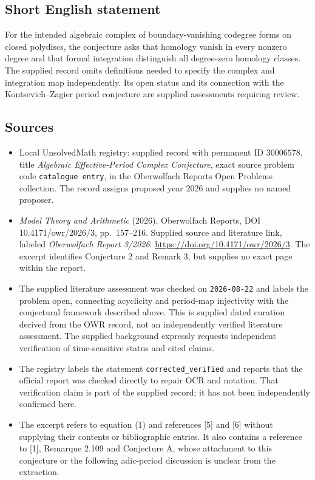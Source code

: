 \documentclass[11pt]{article}
\begin{document}
\subsection{Short English statement}
For the intended algebraic complex of boundary-vanishing codegree forms on closed polydiscs, the conjecture asks that homology vanish in every nonzero degree and that formal integration distinguish all degree-zero homology classes. The supplied record omits definitions needed to specify the complex and integration map independently. Its open status and its connection with the Kontsevich--Zagier period conjecture are supplied assessments requiring review.
\subsection{Sources}
\begin{itemize}
\item Local UnsolvedMath registry: supplied record with permanent ID \(30006578\), title \emph{Algebraic Effective-Period Complex Conjecture}, exact source problem code \texttt{catalogue entry}, in the Oberwolfach Reports Open Problems collection. The record assigns proposed year 2026 and supplies no named proposer.
\item \emph{Model Theory and Arithmetic} (2026), Oberwolfach Reports, DOI 10.4171/owr/2026/3, pp.\ 157--216. Supplied source and literature link, labeled \emph{Oberwolfach Report 3/2026}: \url{https://doi.org/10.4171/owr/2026/3}. The excerpt identifies Conjecture 2 and Remark 3, but supplies no exact page within the report.
\item The supplied literature assessment was checked on \texttt{2026-08-22} and labels the problem open, connecting acyclicity and period-map injectivity with the conjectural framework described above. This is supplied dated curation derived from the OWR record, not an independently verified literature assessment. The supplied background expressly requests independent verification of time-sensitive status and cited claims.
\item The registry labels the statement \texttt{corrected\_verified} and reports that the official report was checked directly to repair OCR and notation. That verification claim is part of the supplied record; it has not been independently confirmed here.
\item The excerpt refers to equation (1) and references [5] and [6] without supplying their contents or bibliographic entries. It also contains a reference to [1], Remarque 2.109 and Conjecture A, whose attachment to this conjecture or the following adic-period discussion is unclear from the extraction.
\end{itemize}
\end{document}
